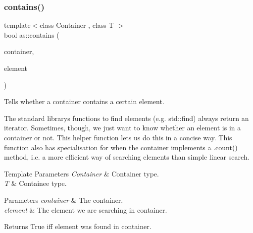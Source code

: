 \subsubsection{\texorpdfstring{contains()}{contains()}}
{\footnotesize\ttfamily template$<$class Container , class T $>$ \\
bool as\+::contains (\begin{DoxyParamCaption}\item[{const Container \&}]{container,  }\item[{const T \&}]{element }\end{DoxyParamCaption})\hspace{0.3cm}{\ttfamily [inline]}}



Tells whether a container contains a certain element. 

The standard library\textquotesingle{}s functions to find elements (e.\+g. std\+::find) always return an iterator. Sometimes, though, we just want to know whether an element is in a container or not. This helper function lets us do this in a concise way. This function also has specialisation for when the container implements a .count() method, i.\+e. a more efficient way of searching elements than simple linear search.


\begin{DoxyTemplParams}{Template Parameters}
{\em Container} & Container type. \\
\hline
{\em T} & Containee type. \\
\hline
\end{DoxyTemplParams}

\begin{DoxyParams}{Parameters}
{\em container} & The container. \\
\hline
{\em element} & The element we are searching in {\ttfamily container}. \\
\hline
\end{DoxyParams}
\begin{DoxyReturn}{Returns}
True iff {\ttfamily element} was found in {\ttfamily container}. 
\end{DoxyReturn}
\mbox{\label{namespaceas_aab6569c28591bebed9bd29b40c772bfc}} 
